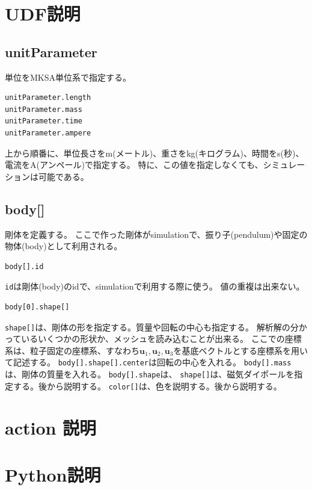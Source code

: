 \documentclass[a4paper,11pt]{jbook}
\begin{document}
\chapter{UDF説明}
\section{unitParameter}
単位をMKSA単位系で指定する。
\begin{verbatim}
unitParameter.length
unitParameter.mass
unitParameter.time
unitParameter.ampere
\end{verbatim}
上から順番に、単位長さをm(メートル)、重さをkg(キログラム)、時間をs(秒)、電流をA(アンペール)で指定する。
特に、この値を指定しなくても、シミュレーションは可能である。
\section{body[]}
剛体を定義する。
ここで作った剛体がsimulationで、振り子(pendulum)や固定の物体(body)として利用される。
\begin{verbatim}
body[].id
\end{verbatim}
\verb|id|は剛体(body)のidで、simulationで利用する際に使う。
値の重複は出来ない。
\begin{verbatim}
body[0].shape[]
\end{verbatim}
\verb|shape[]|は、剛体の形を指定する。質量や回転の中心も指定する。
解析解の分かっているいくつかの形状か、メッシュを読み込むことが出来る。
ここでの座標系は、粒子固定の座標系、すなわち$\bm{u}_1,\bm{u}_2,\bm{u}_3$を基底ベクトルとする座標系を用いて記述する。
\verb|body[].shape[].center|は回転の中心を入れる。
\verb|body[].mass|は、剛体の質量を入れる。
\verb|body[].shape|は、
\verb|shape[]|は、磁気ダイポールを指定する。後から説明する。
\verb|color[]|は、色を説明する。後から説明する。
 \chapter{action 説明}
  
\chapter{Python説明}
  
\end{document}
